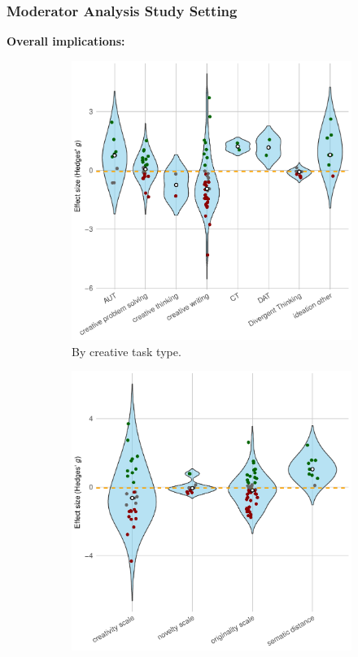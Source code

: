 \documentclass[manuscript, screen, review, acmsmall, anonymous]{acmart}
\begin{document}
\subsubsection{Moderator Analysis Study Setting}
\label{sec:CreativePerformanceComparisonOfHumanAndAI_Moderator_StudySetting}
\textbf{Overall implications:}
\begin{figure}[H]
  \centering
  \begin{subfigure}[t]{0.49\linewidth}
    \centering
    \includegraphics[width=\linewidth]{plot_versus_raw_violin_Task_Type}
    \caption{By creative task type.}
    \label{fig:versus_raw_violin_task_type}
  \end{subfigure}%
  \hfill
  \begin{subfigure}[t]{0.49\linewidth}
    \centering
    \includegraphics[width=\linewidth]{plot_versus_raw_violin_Creativity_Measurement}

\end{subfigure}
\end{figure}
\end{document}
